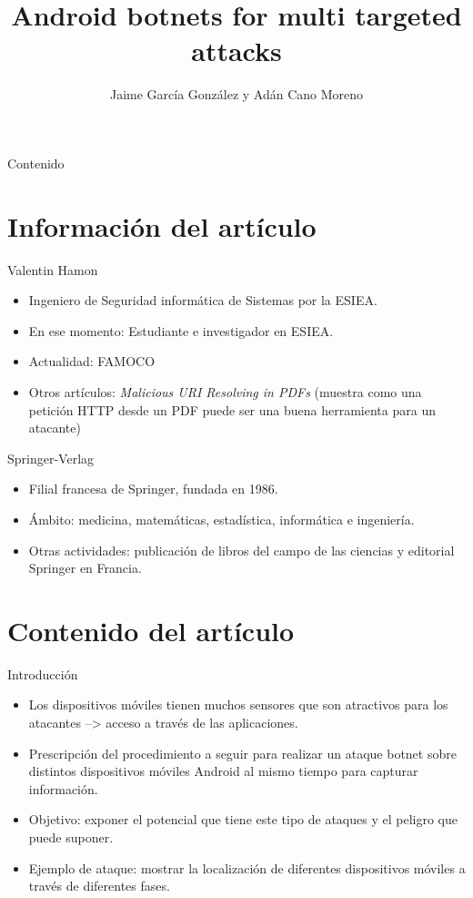 \documentclass[aspectratio=43]{beamer}
\title{Android botnets for multi targeted attacks}
\author{Jaime García González y Adán Cano Moreno}
\institute{Universidad Carlos III de Madrid}
\begin{document}
\maketitle
\begin{frame}{Contenido}
  \tableofcontents
\end{frame}

\section{Información del artículo}
\begin{frame}{Valentin Hamon}
  \begin{itemize}
   \item  Ingeniero de Seguridad informática de Sistemas por la ESIEA.
  \item En ese momento: Estudiante e investigador en ESIEA. 
  \item Actualidad:  FAMOCO
  \item Otros artículos: \emph{Malicious URI Resolving in
PDFs} (muestra como una petición HTTP desde un PDF puede
ser una buena herramienta para un atacante)
  \end{itemize}
\end{frame}
\begin{frame}{Springer-Verlag}
  \begin{itemize}
   \item  Filial francesa
de Springer, fundada en 1986.
  \item Ámbito: medicina, matemáticas, estadística, informática e ingeniería.
  \item Otras actividades:  publicación de libros del campo de las ciencias y editorial Springer en
Francia.

  \end{itemize}
\end{frame}
\section{Contenido del artículo}

\begin{frame}{Introducción}
\begin{itemize}
\item Los dispositivos móviles tienen muchos sensores que son atractivos para
los atacantes --> acceso a través de las aplicaciones.

\item Prescripción del procedimiento a seguir para realizar un ataque botnet 
sobre distintos dispositivos móviles Android al mismo tiempo para capturar información. 

\item Objetivo: exponer el potencial que tiene este tipo de ataques y el peligro
que puede suponer. 

\item Ejemplo de ataque: mostrar la localización de diferentes dispositivos móviles a través de diferentes fases. 

  \end{itemize}  
\end{frame}
\end{document}
